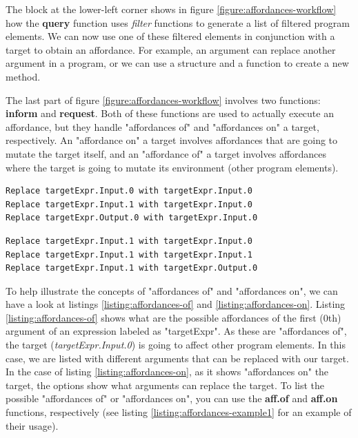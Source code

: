 \documentclass[11pt,fleqn,openany]{book} %
\begin{document}
The block at the lower-left corner shows in figure \ref{figure:affordances-workflow} how the \textbf{query} function uses \emph{filter} functions to generate a list of filtered program elements. We can now use one of these filtered elements in conjunction with a target to obtain an affordance. For example, an argument can replace another argument in a program, or we can use a structure and a function to create a new method.

The last part of figure \ref{figure:affordances-workflow} involves two functions: \textbf{inform} and \textbf{request}. Both of these functions are used to actually execute an affordance, but they handle "affordances of" and "affordances on" a target, respectively. An "affordance on" a target involves affordances that are going to mutate the target itself, and an "affordance of" a target involves affordances where the target is going to mutate its environment (other program elements).

\begin{lstlisting}[caption={A list of "affordances of" an argument},captionpos=b,label={listing:affordances-of}]
Replace targetExpr.Input.0 with targetExpr.Input.0
Replace targetExpr.Input.1 with targetExpr.Input.0
Replace targetExpr.Output.0 with targetExpr.Input.0
\end{lstlisting}

\begin{lstlisting}[caption={A list of "affordances on" an argument},captionpos=b,label={listing:affordances-on}]
Replace targetExpr.Input.1 with targetExpr.Input.0
Replace targetExpr.Input.1 with targetExpr.Input.1
Replace targetExpr.Input.1 with targetExpr.Output.0
\end{lstlisting}

To help illustrate the concepts of "affordances of" and "affordances on", we can have a look at listings \ref{listing:affordances-of} and \ref{listing:affordances-on}. Listing \ref{listing:affordances-of} shows what are the possible affordances of the first (0th) argument of an expression labeled as "targetExpr". As these are "affordances of", the target (\textit{targetExpr.Input.0}) is going to affect other program elements. In this case, we are listed with different arguments that can be replaced with our target. In the case of listing \ref{listing:affordances-on}, as it shows "affordances on" the target, the options show what arguments can replace the target. To list the possible "affordances of" or "affordances on", you can use the \textbf{aff.of} and \textbf{aff.on} functions, respectively (see listing \ref{listing:affordances-example1} for an example of their usage).
\end{document}
